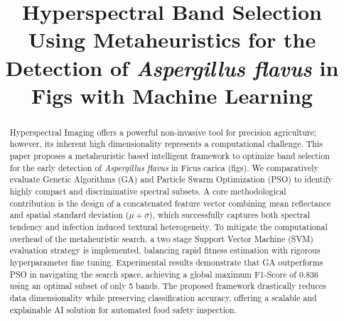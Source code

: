 \documentclass[runningheads]{llncs}
\begin{document}
%
\title{Hyperspectral Band Selection Using Metaheuristics for the Detection of \textit{Aspergillus flavus} in Figs with Machine Learning}
%
%

%
%
\maketitle              %
%
\begin{abstract}
Hyperspectral Imaging offers a powerful non-invasive tool for precision agriculture; however, its inherent high dimensionality represents a computational challenge. This paper proposes a metaheuristic based intelligent framework to optimize band selection for the early detection of \textit{Aspergillus flavus} in Ficus carica (figs). We comparatively evaluate Genetic Algorithms (GA) and Particle Swarm Optimization (PSO) to identify highly compact and discriminative spectral subsets. A core methodological contribution is the design of a concatenated feature vector combining mean reflectance and spatial standard deviation ($\mu+\sigma$), which successfully captures both spectral tendency and infection induced textural heterogeneity. To mitigate the computational overhead of the metaheuristic search, a two stage Support Vector Machine (SVM) evaluation strategy is implemented, balancing rapid fitness estimation with rigorous hyperparameter fine tuning. Experimental results demonstrate that GA outperforms PSO in navigating the search space, achieving a global maximum F1-Score of 0.836 using an optimal subset of only 5 bands. The proposed framework drastically reduces data dimensionality while preserving classification accuracy, offering a scalable and explainable AI solution for automated food safety inspection.

\end{abstract}
%
%
%
\end{document}
